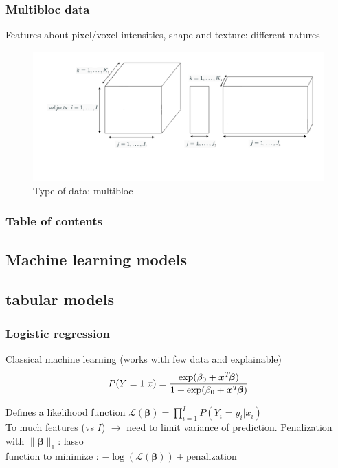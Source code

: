 \documentclass{beamer}
\begin{document}
\begin{frame}
    \frametitle{Multibloc data}
    Features about pixel/voxel intensities, shape and texture: different natures
    \begin{figure}
        \centering
        \includegraphics[scale = 0.25]{images/blocks.png}
        \caption{Type of data: multibloc}
    \end{figure}
\end{frame}



\begin{frame}
    \frametitle{Table of contents}
    \tableofcontents
\end{frame}

\begin{frame}
    \section{Machine learning models}
    \subsection{tabular models}
\end{frame}

\begin{frame}
    \frametitle{Logistic regression}
    Classical machine learning (works with few data and explainable)\\[10 pt]

    $$P(Y = 1|x) = \frac{\exp(\beta_0 + \bm{x}^T\hspace{-2 pt}\bm{\beta})}{1 + \exp(\beta_0 + \bm{x}^T\hspace{-2 pt}\bm{\beta})}$$

    Defines a likelihood function $\mathcal{L}(\bm{\beta}) = \prod_{i = 1}^I P(Y_i = y_i|x_i)$\\[15 pt]

    To much features (vs $I$) $\rightarrow$ need to limit variance of prediction. Penalization with $\lVert \bm{\beta} \rVert_1$: lasso\\[15 pt]

    function to minimize : $- \log(\mathcal{L}(\bm{\beta})) + \text{penalization}$ 
\end{frame}
\end{document}
